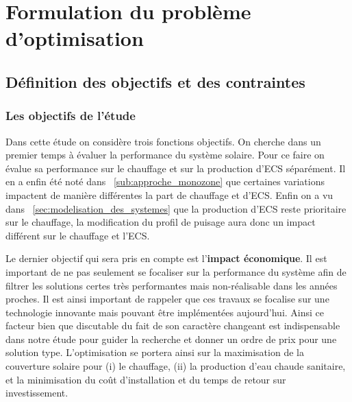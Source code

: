 

\section{Formulation du problème d’optimisation} %
\label{sec:formulation_du_probleme_d_optimisation}
\subsection{Définition des objectifs et des contraintes} %
\label{sub:definition_des_objectifs_et_des_contraintes}

\subsubsection{Les objectifs de l’étude} %
\label{ssub:les_objectifs_de_l_etude}
Dans cette étude on considère trois fonctions objectifs. On cherche dans un premier
temps à évaluer la performance du système solaire. Pour ce faire on évalue sa
performance sur le chauffage et sur la production d’ECS séparément. Il en a enfin
été noté dans ~\autoref{sub:approche_monozone} que certaines variations impactent
de manière différentes la part de chauffage et d’ECS. Enfin on a vu dans
~\autoref{sec:modelisation_des_systemes} que la production d’ECS reste prioritaire
sur le chauffage, la modification du profil de puisage aura donc un impact différent
sur le chauffage et l’ECS.

Le dernier objectif qui sera pris en compte est l’\textbf{impact économique}. Il
est important de ne pas seulement se focaliser sur la performance du système afin
de filtrer les solutions certes très performantes mais non-réalisable dans les années
proches. Il est ainsi important de rappeler que ces travaux se focalise sur une
technologie innovante mais pouvant être implémentées aujourd’hui.
Ainsi ce facteur bien que discutable du fait de son caractère changeant est indispensable
dans notre étude pour guider la recherche et donner un ordre de prix pour une solution
type.
L’optimisation se portera ainsi sur la maximisation de la couverture solaire pour
(i) le chauffage, (ii) la production d’eau chaude sanitaire, et la minimisation
du coût d’installation et du temps de retour sur investissement.

